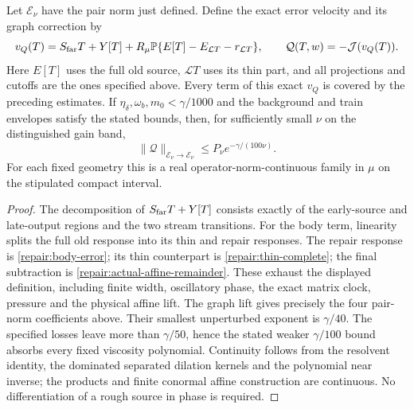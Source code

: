 \begin{proposition}\label{repair:complete-graph-error}
Let $\mathcal E_\nu$ have the pair norm just defined. Define the exact error
velocity and its graph correction by
\[
 v_Q(T)=S_{\rm far}T+Y[T]
       +R_\mu\mathbb P\{E[T]-E_{\mathcal LT}-r_{\mathcal LT}\},
 \qquad \mathcal Q(T,w)=-\mathcal J(v_Q(T)).
\]
Here $E[T]$ uses the full old source, $\mathcal LT$ uses its thin
part, and all projections and cutoffs are the ones specified above.
Every term of this exact $v_Q$ is covered by the preceding estimates.
If $\eta_\delta,\omega_b,m_0<\gamma/1000$ and the background
and train envelopes satisfy the stated bounds, then, for sufficiently
small $\nu$ on the distinguished gain band,
\[
 \|\mathcal Q\|_{\mathcal E_\nu\to\mathcal E_\nu}
           \le P_\nu e^{-\gamma/(100\nu)}.
\]
For each fixed geometry this is a real operator-norm-continuous
family in $\mu$ on the stipulated compact interval.
\end{proposition}
\begin{proof}
The decomposition of $S_{\rm far}T+Y[T]$ consists exactly of the
early-source and late-output regions and the two stream transitions.
For the body term, linearity splits the full old response into its
thin and repair responses. The repair response is
\eqref{repair:body-error}; its thin counterpart is
\eqref{repair:thin-complete}; the final subtraction is
\eqref{repair:actual-affine-remainder}. These exhaust the displayed
definition, including finite width, oscillatory phase, the exact
matrix clock, pressure and the physical affine lift. The graph
lift gives precisely the four pair-norm coefficients above.
Their smallest unperturbed exponent is $\gamma/40$. The specified
losses leave more than $\gamma/50$, hence the stated weaker
$\gamma/100$ bound absorbs every fixed viscosity polynomial.
Continuity follows from the resolvent identity, the dominated
separated dilation kernels and the polynomial near inverse; the
products and finite conormal affine construction are continuous.
No differentiation of a rough source in phase is required.
\end{proof}
